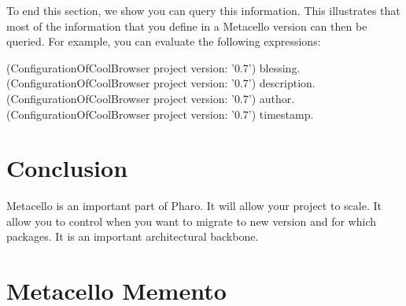 \documentclass[a4paper,10pt,twoside]{book}
\begin{document}
To end this section, we show you can query this information. This illustrates that most of the information that you define in a Metacello version can then be queried. For example, you can evaluate the following expressions:

\begin{code}{}
(ConfigurationOfCoolBrowser project version: '0.7') blessing.
(ConfigurationOfCoolBrowser project version: '0.7') description.
(ConfigurationOfCoolBrowser project version: '0.7') author.
(ConfigurationOfCoolBrowser project version: '0.7') timestamp.
\end{code}


\section{Conclusion}
Metacello is an important part of Pharo. It will allow your project to scale. It allow you to control when you want to migrate to new version and for which packages. It is an important architectural backbone.


\newpage

\section{Metacello Memento}
\end{document}
